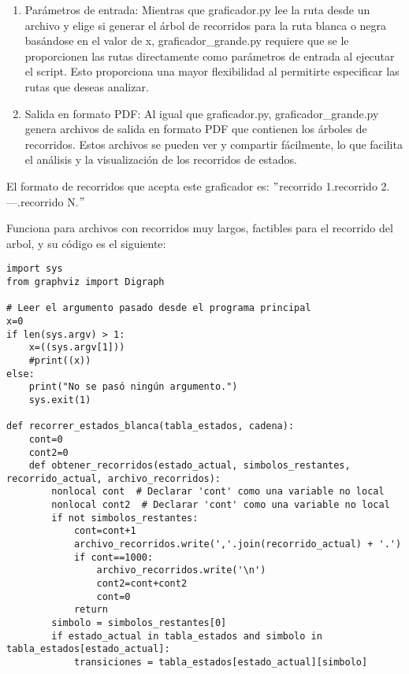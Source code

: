 \begin{enumerate}
\begin{enumerate}
    \item Parámetros de entrada: Mientras que graficador.py lee la ruta desde un archivo y elige si generar el árbol de recorridos para la ruta blanca o negra basándose en el valor de x, graficador\_grande.py requiere que se le proporcionen las rutas directamente como parámetros de entrada al ejecutar el script. Esto proporciona una mayor flexibilidad al permitirte especificar las rutas que deseas analizar.\newline
    
    \item Salida en formato PDF: Al igual que graficador.py, graficador\_grande.py genera archivos de salida en formato PDF que contienen los árboles de recorridos. Estos archivos se pueden ver y compartir fácilmente, lo que facilita el análisis y la visualización de los recorridos de estados.\newline
\end{enumerate}

El formato de recorridos que acepta este graficador es:\newline 
$"$recorrido 1.recorrido 2.---.recorrido N.$"$\newline 

Funciona para archivos con recorridos muy largos, factibles para el recorrido del arbol, y su código es el siguiente:\newline 
\begin{lstlisting}
import sys
from graphviz import Digraph

# Leer el argumento pasado desde el programa principal
x=0
if len(sys.argv) > 1:
    x=((sys.argv[1]))
    #print((x))
else:
    print("No se pasó ningún argumento.")
    sys.exit(1)

def recorrer_estados_blanca(tabla_estados, cadena):
    cont=0
    cont2=0
    def obtener_recorridos(estado_actual, simbolos_restantes, recorrido_actual, archivo_recorridos):
        nonlocal cont  # Declarar 'cont' como una variable no local
        nonlocal cont2  # Declarar 'cont' como una variable no local
        if not simbolos_restantes:
            cont=cont+1
            archivo_recorridos.write(','.join(recorrido_actual) + '.')
            if cont==1000:
                archivo_recorridos.write('\n')
                cont2=cont+cont2
                cont=0
            return
        simbolo = simbolos_restantes[0]
        if estado_actual in tabla_estados and simbolo in tabla_estados[estado_actual]:
            transiciones = tabla_estados[estado_actual][simbolo]


\end{lstlisting}
\end{enumerate}
